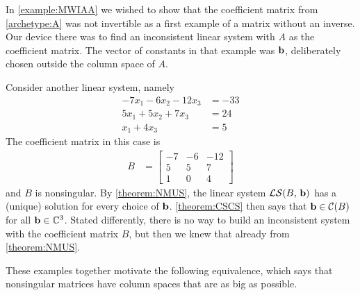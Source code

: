 \documentclass{ximera}
\begin{document}
\begin{example}
  In \ref{example:MWIAA} we wished to show that the coefficient matrix
  from \ref{archetype:A} was not invertible as a first example of a
  matrix without an inverse.  Our device there was to find an
  inconsistent linear system with $A$ as the coefficient matrix.  The
  vector of constants in that example was $\mathbf{b}$, deliberately
  chosen outside the column space of $A$.
\end{example}

\begin{example}
  Consider another linear system, namely
  \begin{align*}
    -7x_1 -6 x_2 - 12x_3 &=-33\\
    5x_1  + 5x_2 + 7x_3 &=24\\
    x_1 +4x_3 &=5
  \end{align*}
  The coefficient matrix in this case is
  \begin{align*}
    B&= \begin{bmatrix}
      -7&-6&-12\\
      5&5&7\\
      1&0&4
    \end{bmatrix}
  \end{align*}
  and $B$ is nonsingular.  By \ref{theorem:NMUS}, the linear system
  $\mathcal{LS}\!\left(B,\,\mathbf{b}\right)$ has a (unique) solution for every
  choice of $\mathbf{b}$.  \ref{theorem:CSCS} then says that
  $\mathbf{b}\in\mathcal{C}\!\left(B\right)$ for all $\mathbf{b}\in\mathbb{C}^{3}$.  Stated
  differently, there is no way to build an inconsistent system with
  the coefficient matrix $B$, but then we knew that already from
  \ref{theorem:NMUS}.
\end{example}

These examples together motivate the following equivalence, which says
that nonsingular matrices have column spaces that are as big as
possible.
\end{document}
